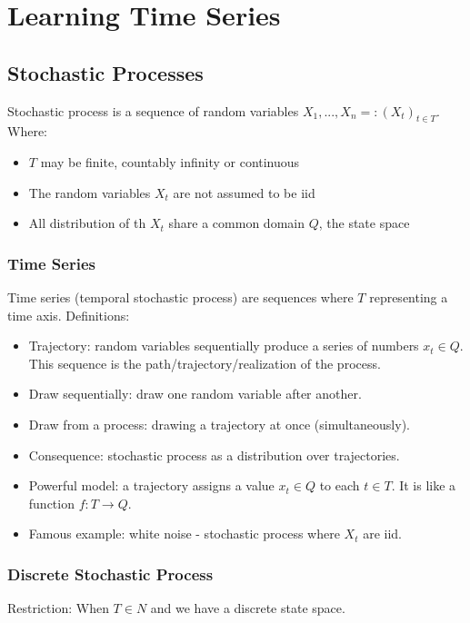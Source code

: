 \documentclass[main]{subfiles}
\begin{document}

\section{Learning Time Series}

\subsection{Stochastic Processes}
Stochastic process is a sequence of random variables
$X_1, . . . , X_n =: (X_t)_{t \in T}$.
Where:
\begin{itemize}
\item $T$ may be finite, countably infinity or continuous
\item The random variables $X_t$ are not assumed to be iid
\item All distribution of th $X_t$ share a common domain $Q$, the state space
\end{itemize}

\subsubsection{Time Series}
Time series (temporal stochastic process) are sequences where $T$ representing a time axis.
Definitions:
\begin{itemize}
\item Trajectory: random variables sequentially produce a series of numbers
$x_t \in Q$. This sequence is the path/trajectory/realization of the process.
\item Draw sequentially: draw one random variable after another.
\item Draw from a process: drawing a trajectory at once (simultaneously).
\item Consequence: stochastic process as a distribution over trajectories.
\item Powerful model: a trajectory assigns a value $x_t \in Q$ to each $t \in T$.
It is like a function $f: T \to Q$.
\item Famous example: white noise - stochastic process where $X_t$ are iid.
\end{itemize}

\subsubsection{Discrete Stochastic Process}
Restriction: When $T \in N$ and we have a discrete state space.
\end{document}
